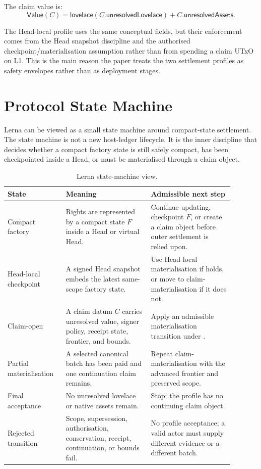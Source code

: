 \documentclass[a4paper,11pt]{article}
\theoremstyle{definition}
\theoremstyle{plain}
\theoremstyle{remark}
\newcommand{\Value}{\mathsf{Value}}
\begin{document}
The claim value is:
\[
  \Value(C)=
  \mathsf{lovelace}(C.\mathsf{unresolvedLovelace})
  + C.\mathsf{unresolvedAssets}.
\]

The Head-local profile uses the same conceptual fields, but their enforcement
comes from the Head snapshot discipline and the authorised
checkpoint/materialisation assumption rather than from spending a claim UTxO on
L1. This is the main reason the paper treats the two settlement profiles as
safety envelopes rather than as deployment stages.

\section{Protocol State Machine}
\label{sec:state-machine}

Lerna can be viewed as a small state machine around compact-state settlement.
The state machine is not a new host-ledger lifecycle. It is the inner discipline
that decides whether a compact factory state is still safely compact, has been
checkpointed inside a Head, or must be materialised through a claim object.

\begin{table}[t]
\centering
\caption{Lerna state-machine view.}
\label{tab:state-machine}
\begin{tabular}{L{0.22\linewidth}L{0.34\linewidth}L{0.33\linewidth}}
\toprule
\textbf{State} & \textbf{Meaning} & \textbf{Admissible next step}\\
\midrule
Compact factory & Rights are represented by a compact state \(F\) inside a
Head or virtual Head. & Continue updating, checkpoint \(F\), or create a claim
object before outer settlement is relied upon.\\
Head-local checkpoint & A signed Head snapshot embeds the latest same-scope
factory state. & Use Head-local materialisation if
 holds, or move to claim-materialisation if it
does not.\\
Claim-open & A claim datum \(C\) carries unresolved value, signer policy,
receipt state, frontier, and bounds. & Apply an admissible materialisation
transition under .\\
Partial materialisation & A selected canonical batch has been paid and one
continuation claim remains. & Repeat claim-materialisation with the advanced
frontier and preserved scope.\\
Final acceptance & No unresolved lovelace or native assets remain. & Stop; the
profile has no continuing claim object.\\
Rejected transition & Scope, supersession, authorisation, conservation,
receipt, continuation, or bounds fail. & No profile acceptance; a valid actor
must supply different evidence or a different batch.\\
\bottomrule
\end{tabular}
\end{table}
\end{document}
